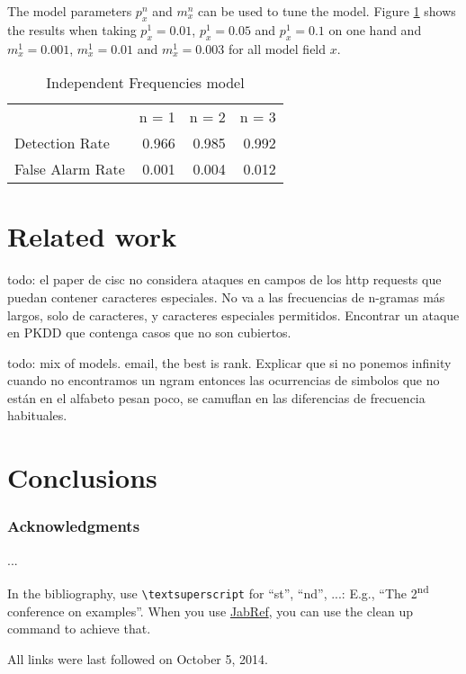 \documentclass[runningheads,a4paper]{llncs}
\begin{document}
The model parameters $p^n_x$ and $m^n_x$ can be used to tune the model. Figure \ref{FrequenciesModelResults} shows the results when taking $p^1_x = 0.01$, $p^1_x = 0.05$ and $p^1_x = 0.1$ on one hand and $m^1_x=0.001$, $m^1_x=0.01$ and $m^1_x=0.003$ for all model field $x$.  

\begin{table}[]
\centering
\caption{Independent Frequencies model}
\label{FrequenciesModelResults}
\begin{tabular}{lrrr}
                 & n = 1   & n = 2   & n = 3   \\
Detection Rate   & 0.966   &  0.985  &  0.992  \\ 
False Alarm Rate & 0.001   &  0.004  &  0.012  \\ 
\end{tabular}
\end{table}

\section{Related work}

todo: el paper de cisc no considera ataques en campos de los http requests que puedan contener caracteres especiales. No va a las frecuencias de n-gramas más largos, solo de caracteres, y caracteres especiales permitidos. Encontrar un ataque en PKDD que contenga casos que no son cubiertos. 

todo: mix of models. email, the best is rank. Explicar que si no ponemos infinity cuando no encontramos un ngram entonces las ocurrencias de simbolos que no están en el alfabeto pesan poco, se camuflan en las diferencias de frecuencia habituales.


\section{Conclusions}


\subsubsection*{Acknowledgments}
...

In the bibliography, use \texttt{\textbackslash textsuperscript} for ``st'', ``nd'', ...:
E.g., \enquote{The 2\textsuperscript{nd} conference on examples}.
When you use \href{http://www.jabref.org}{JabRef}, you can use the clean up command to achieve that.




All links were last followed on October 5, 2014.
\end{document}
